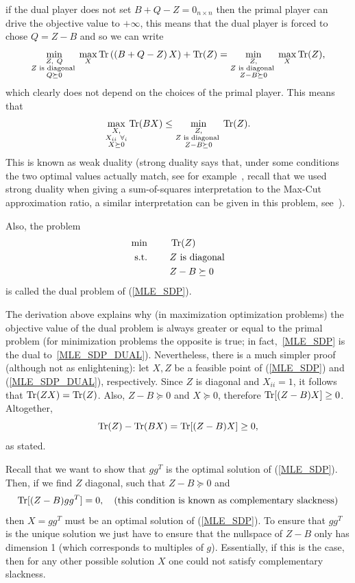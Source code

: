 if the dual player does not set $B+Q-Z=0_{n\times n}$ then the primal player can drive the objective value to $+\infty$, this means that the dual player is forced to chose $Q = Z-B$ and so we can write
\[
  \min_{\substack{Z,\ Q \\ Z \text{ is diagonal } \\ Q\succeq 0}} \max_{X}  \operatorname{Tr}\left(\left( B + Q - Z \right)X\right) + \operatorname{Tr}(Z) = \min_{\substack{Z,\\ Z \text{ is diagonal } \\ Z-B\succeq 0}} \max_{X}  \operatorname{Tr}(Z),
\]
which clearly does not depend on the choices of the primal player. This means that
\[
  \max_{\substack{X,\\ X_{ii}\ \forall_i \\ X\succeq 0}} \operatorname{Tr}(BX) \leq \min_{\substack{Z,\\ Z \text{ is diagonal } \\ Z-B\succeq 0}}  \operatorname{Tr}(Z).
\]
This is known as weak duality (strong duality says that, under some conditions the two optimal values actually match, see for example~\cite{LVanderberghe_SBoyd_1996}, recall that we used strong duality when giving a sum-of-squares interpretation to the Max-Cut approximation ratio, a similar interpretation can be given in this problem, see~\cite{Bandeira_PCC}).

Also, the problem
\begin{align}
\min\ \qquad & \operatorname{Tr}(Z)\nonumber\\
\text{s.t.}\ \qquad & Z \text{ is diagonal} \label{MLE_SDP_DUAL}\\
 & Z - B  \succeq 0 \nonumber
 \end{align}
is called the dual problem of (\ref{MLE_SDP}).

The derivation above explains why (in maximization optimization problems) the objective value of the dual problem is always greater or equal to the primal problem (for minimization problems the opposite is true; in fact,~\eqref{MLE_SDP} is the dual to~\eqref{MLE_SDP_DUAL}). Nevertheless, there is a much simpler proof (although not as enlightening): let $X,Z$ be  a feasible point of (\ref{MLE_SDP}) and (\ref{MLE_SDP_DUAL}), respectively.
Since $Z$ is diagonal and $X_{ii}=1$, it follows that $\operatorname{Tr}(ZX)=\operatorname{Tr}(Z)$. Also, $Z-B\succeq 0$ and $X\succeq 0$, therefore $\operatorname{Tr}[(Z-B)X] \geq 0$. Altogether,
\[
\operatorname{Tr}(Z) - \operatorname{Tr}(BX) = \operatorname{Tr}[(Z-B)X] \geq 0,
\]
as stated.

Recall that we want to show that $gg^T$ is the optimal solution of (\ref{MLE_SDP}). Then, if we find $Z$ diagonal, such that $Z-B \succeq 0$ and
\[
\operatorname{Tr}[(Z-B)gg^T] = 0,  \quad \text{(this condition is known as complementary slackness)}
\]
then $X=gg^T$ must be an optimal solution of (\ref{MLE_SDP}). To ensure that $gg^T$ is the unique solution we just have to ensure that the nullspace of $Z-B$ only has dimension 1 (which corresponds to multiples of $g$). Essentially, if this is the case, then for any other possible solution $X$ one could not satisfy complementary slackness.

